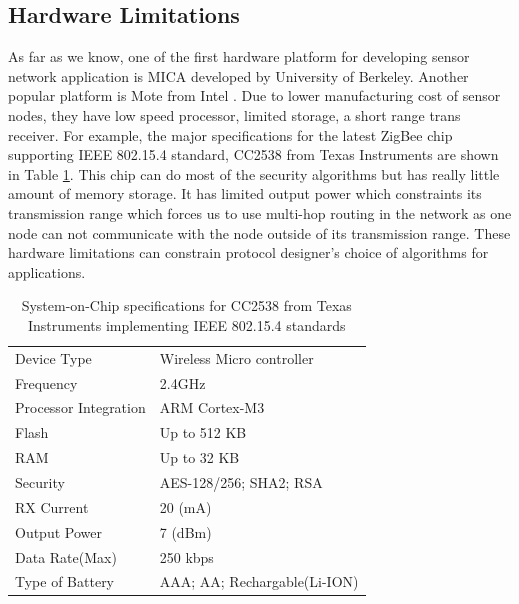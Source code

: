 	\subsection{Hardware Limitations}
		As far as we know, one of the first hardware platform for developing sensor network application is MICA \cite{hill2002mica} developed by University of Berkeley.
		Another popular platform is Mote from Intel \cite{arazi2006self}.
		Due to lower manufacturing cost of sensor nodes, they have low speed processor, limited storage, a short range trans receiver.
		For example, the major specifications for the latest ZigBee chip supporting IEEE 802.15.4 standard, CC2538 from Texas Instruments are shown in Table \ref{table:soc}.
		This chip can do most of the security algorithms but has really little amount of memory storage. It has limited output power which constraints its transmission range which forces us to use multi-hop routing in the network as one node can not communicate with the node outside of its transmission range.
		These hardware limitations can constrain protocol designer's choice of algorithms for applications.  
		\begin{table}[!htb]	
			\begin{center}
			 	\caption{System-on-Chip specifications for CC2538 from Texas Instruments implementing IEEE 802.15.4 standards}
				\label{table:soc}
				\begin{tabular}{ |l| l| }
				    \hline
				    Device Type & Wireless Micro controller \\
				    Frequency & 2.4GHz \\
				    Processor Integration & ARM Cortex-M3 \\
						Flash & Up to 512 KB \\
						RAM & Up to 32 KB \\
						Security & AES-128/256; SHA2; RSA \\
						RX Current & 20 (mA) \\
						Output Power & 7 (dBm) \\
						Data Rate(Max) & 250 kbps \\
						Type of Battery & AAA; AA; Rechargable(Li-ION) \\
				    \hline
				\end{tabular}
			\end{center}
		\end{table}
	

